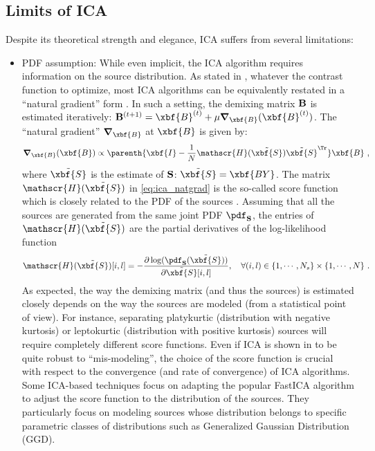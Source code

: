 \subsection{Limits of ICA}
Despite its theoretical strength and elegance, ICA suffers from several limitations:
\begin{itemize}
\item{{PDF assumption:}} While even implicit, the ICA algorithm requires information on the source distribution. 
As stated in \citet{lee98unifying}, whatever the contrast function to optimize, most ICA algorithms can be equivalently restated in a ``natural gradient'' form \citep{Amari99I3SP,ica:cardoama}. In such a setting, the demixing matrix $\bf B$ is estimated iteratively: ${\bf B}^{(t+1)} = \xbf{B}^{(t)} + \mu \boldsymbol{\nabla}_\xbf{B}(\xbf{B}^{(t)})$. The ``natural gradient'' $\boldsymbol{\nabla}_\xbf{B}$ at $\xbf{B}$ is given by: %
\begin{equation}
\label{eq:ica_natgrad}
\boldsymbol{\nabla}_\xbf{B}(\xbf{B}) \propto \parenth{\xbf{I} - \frac{1}{N}\mathscr{H}(\tilde{\xbf{S}})\tilde{\xbf{S}}^\Tr} \xbf{B} ~,
\end{equation}
where $\tilde{\xbf{S}}$ is the estimate of $\bf S$: $ \tilde{\xbf{S}} = \xbf{BY}$. The matrix $\mathscr{H}(\tilde{\xbf{S}})$ in \eqref{eq:ica_natgrad} is the so-called score function which is closely related to the PDF of the sources \citep{miki:Amari,ica:cardoama}. Assuming that all the sources are generated from the same joint PDF $\pdf_{\bf S}$, the entries of $\mathscr{H}(\tilde{\xbf{S}})$ are the partial derivatives of the log-likelihood function
\begin{equation}
\mathscr{H}(\tilde{\xbf{S}})[i,l] = - \frac{\partial \log(\pdf_{\bf S}(\tilde{\xbf{S}}))}{\partial \tilde{\xbf{S}}[i,l]}, \quad \forall (i,l) \in \{1,\cdots,N_s\} \times \{1,\cdots,N\} ~ .
\end{equation}
As expected, the way the demixing matrix (and thus the sources) is estimated closely depends on the way the sources are modeled (from a statistical point of view). For instance, separating platykurtic (distribution with negative kurtosis) or leptokurtic (distribution with positive kurtosis) sources will require completely different score functions. Even if ICA is shown in \citet{ica:cardoama} to be quite  robust to ``mis-modeling'', the choice of the score function is crucial with respect to the convergence (and rate of convergence) of ICA algorithms. Some ICA-based techniques \citep{koldo06} focus on adapting the popular FastICA algorithm to adjust the score function to the distribution of the sources. They particularly focus on modeling sources whose distribution belongs to specific parametric classes of distributions such as Generalized Gaussian Distribution (GGD).

\end{itemize}
